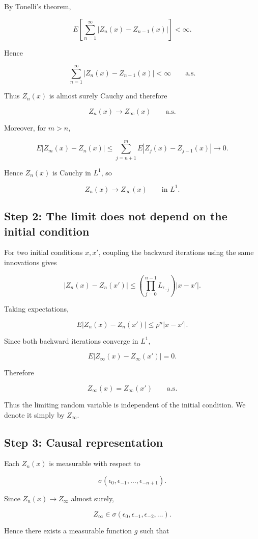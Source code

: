By Tonelli's theorem,

\[E\left[
\sum_{n=1}^\infty
|Z_n(x)-Z_{n-1}(x)|
\right]
<\infty.\]

Hence

\[\sum_{n=1}^\infty
|Z_n(x)-Z_{n-1}(x)|
<\infty
\qquad\text{a.s.}\]

Thus \(Z_n(x)\) is almost surely Cauchy and therefore

\[Z_n(x)\to Z_\infty(x)
\qquad\text{a.s.}\]

Moreover, for \(m>n\),

\[E|Z_m(x)-Z_n(x)|
\le
\sum_{j=n+1}^mE|Z_j(x)-Z_{j-1}(x)|
\to0.\]

Hence \(Z_n(x)\) is Cauchy in \(L^1\), so

\[Z_n(x)\to Z_\infty(x)
\qquad\text{in }L^1.\]

\subsection*{Step 2: The limit does not depend on the initial condition}
For two initial conditions \(x,x'\), coupling the backward iterations using the same innovations gives

\[|Z_n(x)-Z_n(x')|
\le
\left(
\prod_{j=0}^{n-1}L_{\epsilon_{-j}}
\right)|x-x'|.\]

Taking expectations,

\[E|Z_n(x)-Z_n(x')|
\le
\rho^n|x-x'|.\]

Since both backward iterations converge in \(L^1\),

\[E|Z_\infty(x)-Z_\infty(x')|
=
0.\]

Therefore

\[Z_\infty(x)=Z_\infty(x')
\qquad\text{a.s.}\]

Thus the limiting random variable is independent of the initial condition. We denote it simply by \(Z_\infty\).

\subsection*{Step 3: Causal representation}
Each \(Z_n(x)\) is measurable with respect to

\[\sigma(\epsilon_0,\epsilon_{-1},\ldots,\epsilon_{-n+1}).\]

Since \(Z_n(x)\to Z_\infty\) almost surely,

\[Z_\infty
\in
\sigma(\epsilon_0,\epsilon_{-1},\epsilon_{-2},\ldots).\]

Hence there exists a measurable function \(g\) such that

